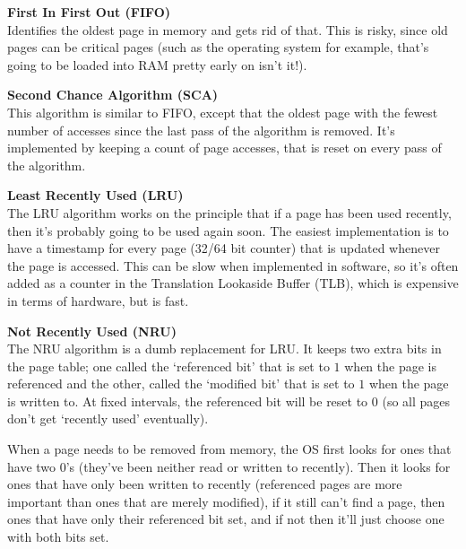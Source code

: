 \begin{description}
  \item \textbf{First In First Out (FIFO)}\\
    Identifies the oldest page in memory and gets rid of that. This is risky,
    since old pages can be critical pages (such as the operating system for
    example, that's going to be loaded into RAM pretty early on isn't it!).

  \item \textbf{Second Chance Algorithm (SCA)}\\
    This algorithm is similar to FIFO, except that the oldest page with the
    fewest number of accesses since the last pass of the algorithm is removed.
    It's implemented by keeping a count of page accesses, that is reset on every
    pass of the algorithm.

  \item \textbf{Least Recently Used (LRU)}\\
    The LRU algorithm works on the principle that if a page has been used
    recently, then it's probably going to be used again soon. The easiest
    implementation is to have a timestamp for every page (32/64 bit counter)
    that is updated whenever the page is accessed. This can be slow when
    implemented in software, so it's often added as a counter in the Translation
    Lookaside Buffer (TLB), which is
    expensive in terms of hardware, but is fast.

  \item \textbf{Not Recently Used (NRU)}\\
    The NRU algorithm is a dumb replacement for LRU. It keeps two extra bits in
    the page table; one called the `referenced bit' that is set to $1$ when the
    page is referenced and the other, called the `modified bit' that is set to
    $1$ when the page is written to. At fixed intervals, the referenced bit will
    be reset to $0$ (so all pages don't get `recently used' eventually).


    When a page needs to be removed from memory, the OS first looks for ones
    that have two $0$'s (they've been neither read or written to recently). Then
    it looks for ones that have only been written to recently (referenced pages
    are more important than ones that are merely modified), if it still can't
    find a page, then ones that have only their referenced bit set, and if not
    then it'll just choose one with both bits set.
\end{description}

